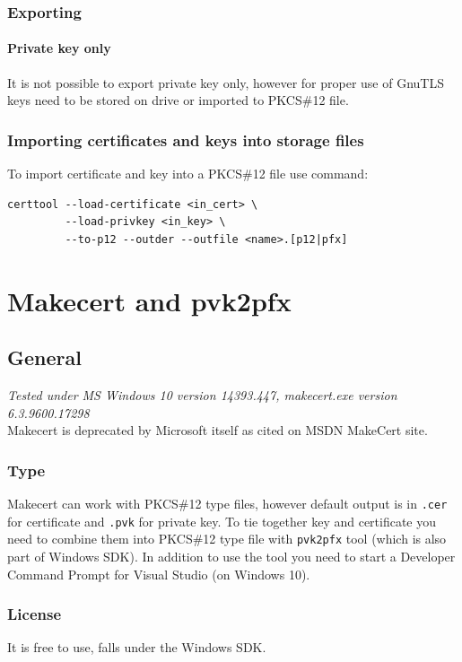 \documentclass[10pt, a4paper]{report}
\begin{document}
  \subsection{Exporting}
  
    \subsubsection{Private key only}
It is not possible to export private key only, however for proper use of GnuTLS keys need to be stored on drive or imported to PKCS\#12 file.
  \subsection{Importing certificates and keys into storage files}
To import certificate and key into a PKCS\#12 file use command:
\begin{verbatim}
certtool --load-certificate <in_cert> \
         --load-privkey <in_key> \
         --to-p12 --outder --outfile <name>.[p12|pfx]
\end{verbatim}   



\chapter{Makecert and pvk2pfx}

\section{General}

\textit{Tested under MS Windows 10 version 14393.447, makecert.exe version 6.3.9600.17298} \\
Makecert is deprecated by Microsoft itself as cited on MSDN MakeCert site.

  \subsection{Type}
Makecert can work with PKCS\#12 type files, however  default output is in \verb+.cer+ for certificate and \verb+.pvk+ for private key. To tie together key and certificate you need to combine them into PKCS\#12 type file with \verb+pvk2pfx+ tool (which is also part of Windows SDK). In addition to use the tool you need to start a Developer Command Prompt for Visual Studio (on Windows 10). 

  \subsection{License}
It is free to use, falls under the Windows SDK.
  
\end{document}
